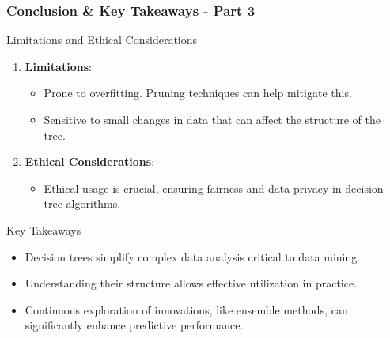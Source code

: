 \documentclass[aspectratio=169]{beamer}
\begin{document}
\begin{frame}[fragile]
    \frametitle{Conclusion \& Key Takeaways - Part 3}
    \begin{block}{Limitations and Ethical Considerations}
        \begin{enumerate}
            \item \textbf{Limitations}:
            \begin{itemize}
                \item Prone to overfitting. Pruning techniques can help mitigate this.
                \item Sensitive to small changes in data that can affect the structure of the tree.
            \end{itemize}
            
            \item \textbf{Ethical Considerations}:
            \begin{itemize}
                \item Ethical usage is crucial, ensuring fairness and data privacy in decision tree algorithms.
            \end{itemize}
        \end{enumerate}
    \end{block}

    \begin{block}{Key Takeaways}
        \begin{itemize}
            \item Decision trees simplify complex data analysis critical to data mining.
            \item Understanding their structure allows effective utilization in practice.
            \item Continuous exploration of innovations, like ensemble methods, can significantly enhance predictive performance.
        \end{itemize}
    \end{block}
\end{frame}
\end{document}
